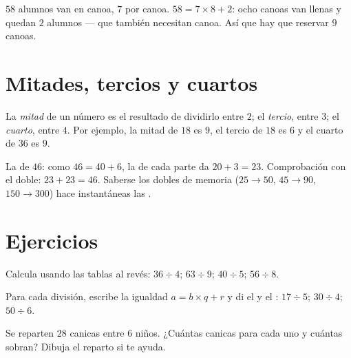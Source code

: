 \begin{example}\label{ex:g3:division:interpret}
$58$ alumnos van en canoa, $7$ por canoa. $58 = 7 \times 8 + 2$:
ocho canoas van llenas y quedan $2$ alumnos --- que también necesitan
canoa. Así que hay que reservar $9$ canoas.
\end{example}

\section{Mitades, tercios y cuartos}

\begin{definition}\label{def:g3:division:half}
La \emph{mitad} de un número es el resultado de dividirlo entre $2$; el
\emph{tercio}, entre $3$; el \emph{cuarto}, entre $4$. Por ejemplo, la
mitad de $18$ es $9$, el tercio de $18$ es $6$ y el cuarto de $36$
es $9$.
\end{definition}

\begin{example}\label{ex:g3:division:double}
La  de $46$: como $46 = 40 + 6$, la  de cada parte da
$20 + 3 = 23$. Comprobación con el doble: $23 + 23 = 46$. Saberse los
dobles de memoria ($25 \to 50$, $45 \to 90$, $150 \to 300$) hace
instantáneas las .
\end{example}

\section{Ejercicios}

\begin{exercise}[$\star$]\label{exo:g3:division:1}
Calcula usando las tablas al revés: $36 \div 4$; \quad $63 \div 9$;
\quad $40 \div 5$; \quad $56 \div 8$.
\end{exercise}

\begin{exercise}[$\star$]\label{exo:g3:division:2}
Para cada división, escribe la igualdad $a = b \times q + r$ y di
el  y el : $17 \div 5$; \quad $30 \div 4$; \quad
$50 \div 6$.
\end{exercise}

\begin{exercise}[$\star$]\label{exo:g3:division:3}
Se reparten $28$ canicas entre $6$ niños. ¿Cuántas canicas para cada uno
y cuántas sobran? Dibuja el reparto si te ayuda.
\end{exercise}

